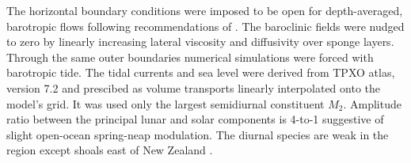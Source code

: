 \documentclass[12pt]{article}
\begin{document}
The horizontal boundary conditions were imposed to be open for depth-averaged, barotropic flows 
following recommendations of \cite{marchesiello2001open}. The baroclinic fields were  
nudged to zero by linearly increasing lateral viscosity and diffusivity over sponge layers. Through 
the same outer boundaries numerical simulations were forced with barotropic tide. The tidal 
currents and sea level were derived from TPXO atlas, version 7.2 \citep{egbert2002efficient} and 
prescibed as volume transports linearly interpolated onto the model's grid. It was used only the 
largest semidiurnal 
constituent $M_2$. Amplitude ratio between the principal lunar and solar components is 4-to-1 
suggestive of slight open-ocean spring-neap modulation. The diurnal species are weak in the region 
except shoals east of New Zealand \citep{walters2001ocean}.\\
\end{document}
